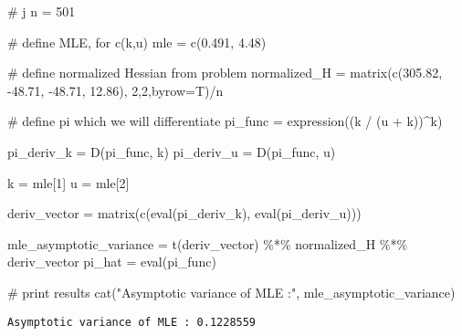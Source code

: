 \documentclass[
  letterpaper,
  DIV=11,
  numbers=noendperiod]{scrartcl}
\newenvironment{Shaded}{\begin{snugshade}}{\end{snugshade}}
\newcommand{\AttributeTok}[1]{\textcolor[rgb]{0.40,0.45,0.13}{#1}}
\newcommand{\CommentTok}[1]{\textcolor[rgb]{0.37,0.37,0.37}{#1}}
\newcommand{\DecValTok}[1]{\textcolor[rgb]{0.68,0.00,0.00}{#1}}
\newcommand{\FloatTok}[1]{\textcolor[rgb]{0.68,0.00,0.00}{#1}}
\newcommand{\FunctionTok}[1]{\textcolor[rgb]{0.28,0.35,0.67}{#1}}
\newcommand{\NormalTok}[1]{\textcolor[rgb]{0.00,0.23,0.31}{#1}}
\newcommand{\OtherTok}[1]{\textcolor[rgb]{0.00,0.23,0.31}{#1}}
\newcommand{\SpecialCharTok}[1]{\textcolor[rgb]{0.37,0.37,0.37}{#1}}
\newcommand{\StringTok}[1]{\textcolor[rgb]{0.13,0.47,0.30}{#1}}
\begin{document}
\begin{Shaded}
\begin{Highlighting}[]
\CommentTok{\# j }
\NormalTok{n }\OtherTok{=} \DecValTok{501}

\CommentTok{\# define MLE, for c(k,u)}
\NormalTok{mle }\OtherTok{=} \FunctionTok{c}\NormalTok{(}\FloatTok{0.491}\NormalTok{, }\FloatTok{4.48}\NormalTok{)}

\CommentTok{\# define normalized Hessian from problem}
\NormalTok{normalized\_H }\OtherTok{=} \FunctionTok{matrix}\NormalTok{(}\FunctionTok{c}\NormalTok{(}\FloatTok{305.82}\NormalTok{, }\SpecialCharTok{{-}}\FloatTok{48.71}\NormalTok{, }\SpecialCharTok{{-}}\FloatTok{48.71}\NormalTok{, }\FloatTok{12.86}\NormalTok{), }\DecValTok{2}\NormalTok{,}\DecValTok{2}\NormalTok{,}\AttributeTok{byrow=}\NormalTok{T)}\SpecialCharTok{/}\NormalTok{n}

\CommentTok{\# define pi which we will differentiate}
\NormalTok{pi\_func }\OtherTok{=} \FunctionTok{expression}\NormalTok{((k }\SpecialCharTok{/}\NormalTok{ (u }\SpecialCharTok{+}\NormalTok{ k))}\SpecialCharTok{\^{}}\NormalTok{k)}

\NormalTok{pi\_deriv\_k }\OtherTok{=} \FunctionTok{D}\NormalTok{(pi\_func, }\StringTok{\textquotesingle{}k\textquotesingle{}}\NormalTok{)}
\NormalTok{pi\_deriv\_u }\OtherTok{=} \FunctionTok{D}\NormalTok{(pi\_func, }\StringTok{\textquotesingle{}u\textquotesingle{}}\NormalTok{)}

\NormalTok{k }\OtherTok{=}\NormalTok{ mle[}\DecValTok{1}\NormalTok{]}
\NormalTok{u }\OtherTok{=}\NormalTok{ mle[}\DecValTok{2}\NormalTok{]}

\NormalTok{deriv\_vector }\OtherTok{=} \FunctionTok{matrix}\NormalTok{(}\FunctionTok{c}\NormalTok{(}\FunctionTok{eval}\NormalTok{(pi\_deriv\_k), }\FunctionTok{eval}\NormalTok{(pi\_deriv\_u)))}

\NormalTok{mle\_asymptotic\_variance }\OtherTok{=} \FunctionTok{t}\NormalTok{(deriv\_vector) }\SpecialCharTok{\%*\%}\NormalTok{ normalized\_H }\SpecialCharTok{\%*\%}\NormalTok{ deriv\_vector}
\NormalTok{pi\_hat }\OtherTok{=} \FunctionTok{eval}\NormalTok{(pi\_func)}

\CommentTok{\# print results }
\FunctionTok{cat}\NormalTok{(}\StringTok{"Asymptotic variance of MLE :"}\NormalTok{, mle\_asymptotic\_variance)}
\end{Highlighting}
\end{Shaded}

\begin{verbatim}
Asymptotic variance of MLE : 0.1228559
\end{verbatim}
\end{document}
